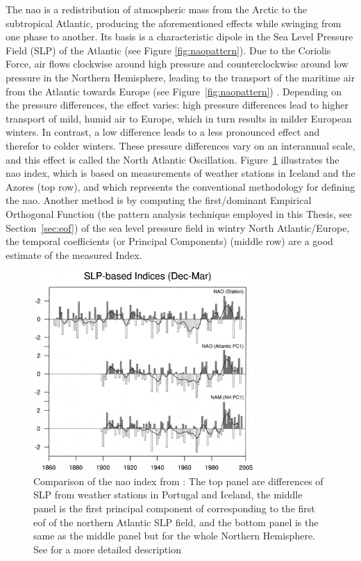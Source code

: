The \ac{nao} is a redistribution of atmospheric mass from the Arctic to the subtropical Atlantic, producing the aforementioned effects while swinging from one phase to another. 
Its basis is a characteristic dipole in the Sea Level Pressure Field (SLP) of the Atlantic (see Figure \ref{fig:naopattern}).
Due to the Coriolis Force, air flows clockwise around high pressure and counterclockwise around low pressure in the Northern Hemisphere, leading to the transport of the maritime air from the Atlantic towards Europe (see Figure~\ref{fig:naopattern}) \cite{hurrell_overview_2003, vietinghoffdiss}. 
Depending on the pressure differences, the effect varies: high pressure differences lead to higher transport of mild, humid air to Europe, which in turn results in milder European winters. In contrast, a low difference leads to a less pronounced effect and therefor to colder winters. 
These pressure differences vary on an interannual scale, and this effect is called the North Atlantic Oscillation. 
Figure~\ref{fig:naoindex_comparison} illustrates the \ac{nao} index, which is based on measurements of weather stations in Iceland and the Azores (top row), and which represents the conventional methodology for defining the \ac{nao}. 
Another method is by computing the first/dominant Empirical Orthogonal Function (the pattern analysis technique employed in this Thesis, see Section~\ref{sec:eof}) of the sea level pressure field in wintry North Atlantic/Europe, the temporal coefficients (or Principal Components) (middle row) are a good estimate of the measured Index. 

\begin{figure}[htb]
  \begin{center}
    \includegraphics[width=0.75\textwidth]{figures/hurrel_nao_index_comparison.png}
  \end{center}
  \caption{Comparison of the \ac{nao} index from \cite{hurrell_overview_2003}: The top panel are differences of SLP from weather stations in Portugal and Iceland, the middle panel is the first principal component of corresponding to the first \ac{eof} of the northern Atlantic SLP field, and the bottom panel is the same as the middle panel but for the whole Northern Hemisphere. See \cite{hurrell_overview_2003} for a more detailed description}
  \label{fig:naoindex_comparison}
\end{figure}

